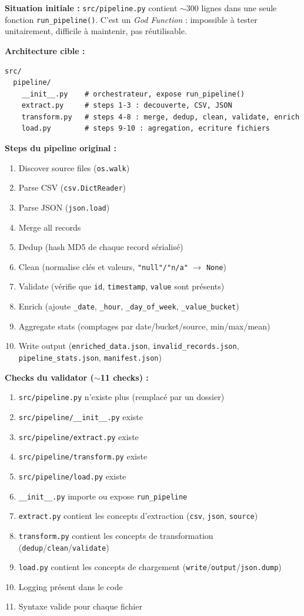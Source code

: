 \documentclass[11pt,a4paper]{article}
\newcommand{\code}[1]{\texttt{#1}}
\begin{document}
\textbf{Situation initiale :}
\code{src/pipeline.py} contient $\sim$300 lignes dans une seule fonction
\code{run\_pipeline()}. C'est un \textit{God Function} : impossible à tester
unitairement, difficile à maintenir, pas réutilisable.

\textbf{Architecture cible :}
\begin{lstlisting}
src/
  pipeline/
    __init__.py    # orchestrateur, expose run_pipeline()
    extract.py     # steps 1-3 : decouverte, CSV, JSON
    transform.py   # steps 4-8 : merge, dedup, clean, validate, enrich
    load.py        # steps 9-10 : agregation, ecriture fichiers
\end{lstlisting}

\textbf{Steps du pipeline original :}
\begin{enumerate}
  \item Discover source files (\code{os.walk})
  \item Parse CSV (\code{csv.DictReader})
  \item Parse JSON (\code{json.load})
  \item Merge all records
  \item Dedup (hash MD5 de chaque record sérialisé)
  \item Clean (normalise clés et valeurs, \code{"null"/"n/a"} $\to$ \code{None})
  \item Validate (vérifie que \code{id}, \code{timestamp}, \code{value} sont présents)
  \item Enrich (ajoute \code{\_date}, \code{\_hour}, \code{\_day\_of\_week}, \code{\_value\_bucket})
  \item Aggregate stats (comptages par date/bucket/source, min/max/mean)
  \item Write output (\code{enriched\_data.json}, \code{invalid\_records.json},
        \code{pipeline\_stats.json}, \code{manifest.json})
\end{enumerate}

\textbf{Checks du validator ($\sim$11 checks) :}
\begin{enumerate}
  \item \code{src/pipeline.py} n'existe plus (remplacé par un dossier)
  \item \code{src/pipeline/\_\_init\_\_.py} existe
  \item \code{src/pipeline/extract.py} existe
  \item \code{src/pipeline/transform.py} existe
  \item \code{src/pipeline/load.py} existe
  \item \code{\_\_init\_\_.py} importe ou expose \code{run\_pipeline}
  \item \code{extract.py} contient les concepts d'extraction (\code{csv}, \code{json}, \code{source})
  \item \code{transform.py} contient les concepts de transformation (\code{dedup}/\code{clean}/\code{validate})
  \item \code{load.py} contient les concepts de chargement (\code{write}/\code{output}/\code{json.dump})
  \item Logging présent dans le code
  \item Syntaxe valide pour chaque fichier
\end{enumerate}
\end{document}
